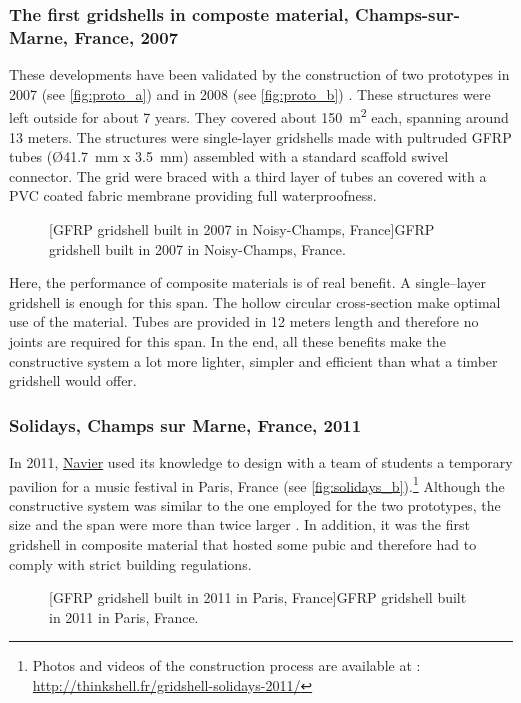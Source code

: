 \subsubsection{The first gridshells in composte material, Champs-sur-Marne, France, 2007}
\label{sec:proto}
These developments have been validated by the construction of two prototypes in 2007 (see \cref{fig:proto_a}) and in 2008 (see \ref{fig:proto_b}) \cite{Douthe2006}. These structures were left outside for about 7 years. They covered about \SI{150}{m^2} each, spanning around 13 meters. The structures were single-layer gridshells made with pultruded GFRP tubes (\O \SI{41.7}{mm} x \SI{3.5}{mm}) assembled with a standard scaffold swivel connector. The grid were braced with a third layer of tubes an covered with a PVC coated fabric membrane providing full waterproofness.
\begin{figure}[h]
		\hspace*{\fill}
		\vspace{10pt}
		[GFRP gridshell built in 2007 in Noisy-Champs, France]{GFRP gridshell built in 2007 in Noisy-Champs, France.}
		\label{fig:proto}    
\end{figure}

Here, the performance of composite materials is of real benefit. A single--layer gridshell is enough for this span. The hollow circular cross-section make optimal use of the material. Tubes are provided in 12 meters length and therefore no joints are required for this span. In the end, all these benefits make the constructive system a lot more lighter, simpler and efficient than what a timber gridshell would offer.

\subsubsection{Solidays, Champs sur Marne, France, 2011}
In 2011, \href{http://navier.enpc.fr}{Navier} used its knowledge to design with a team of students a temporary pavilion for a music festival in Paris, France (see \cref{fig:solidays_b}).\footnote{Photos and videos of the construction process are available at : \url{ http://thinkshell.fr/gridshell-solidays-2011/}} Although the constructive system was similar to the one employed for the two prototypes, the size and the span were more than twice larger  \cite{Baverel2012}. In addition, it was the first gridshell in composite material that hosted some pubic and therefore had to comply with strict building regulations. 
\begin{figure}[h]
		\hspace*{\fill}
		\vspace{10pt}
		[GFRP gridshell built in 2011 in Paris, France]{GFRP gridshell built in 2011 in Paris, France.}
		\label{fig:solidays}    
\end{figure}


